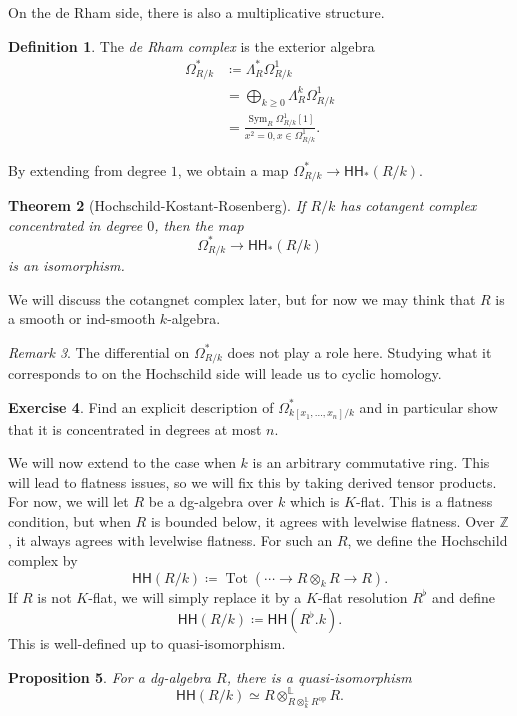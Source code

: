 \documentclass[10pt]{amsart}
\newtheorem{thm}{Theorem}[subsection]
\newtheorem{prop}[thm]{Proposition}
\theoremstyle{definition}
\newtheorem{defn}[thm]{Definition}
\newtheorem{exer}[thm]{Exercise}
\theoremstyle{remark}
\newtheorem{rmk}[thm]{Remark}
\theoremstyle{plain}
\theoremstyle{definition}
\theoremstyle{remark}
\newcommand{\Z}{\mathbb{Z}}
\renewcommand{\L}{\mathbb{L}}
\newcommand{\mr}[1]{\mathrm{#1}}
\newcommand{\ms}[1]{\mathsf{#1}}
\newcommand{\1}{\mathbf{1}}
\newcommand{\2}{\mathbf{2}}
\newcommand{\3}{\mathbf{3}}
\newcommand{\HH}{\ms{HH}}
\DeclareMathOperator{\Sym}{Sym}
\DeclareMathOperator{\Tot}{Tot}
\begin{document}
On the de Rham side, there is also a multiplicative structure.
\begin{defn}
    The \textit{de Rham complex} is the exterior algebra
    \begin{align*}
        \Omega^*_{R/k} &\coloneqq \Lambda_R^* \Omega^1_{R/k} \\
        &= \bigoplus_{k \geq 0} \Lambda_R^k \Omega^1_{R/k} \\
        &= \frac{\Sym_R \Omega^1_{R/k}[1]}{x^2 = 0, x \in \Omega^1_{R/k}}.
    \end{align*}
\end{defn}

By extending from degree $1$, we obtain a map $\Omega^*_{R/k} \to \HH_*(R/k)$.

\begin{thm}[Hochschild-Kostant-Rosenberg]\label{thm:hkr}
    If $R/k$ has cotangent complex concentrated in degree $0$, then the map
    \[ \Omega^*_{R/k} \to \HH_*(R/k) \]
    is an isomorphism.
\end{thm}

We will discuss the cotangnet complex later, but for now we may think that $R$ is a smooth or ind-smooth $k$-algebra.

\begin{rmk}
    The differential on $\Omega^*_{R/k}$ does not play a role here. Studying what it corresponds to on the Hochschild side will leade us to cyclic homology.
\end{rmk}

\begin{exer}
    Find an explicit description of $\Omega^*_{k[x_1, \ldots, x_n]/k}$ and in particular show that it is concentrated in degrees at most $n$.
\end{exer}

We will now extend to the case when $k$ is an arbitrary commutative ring. This will lead to flatness issues, so we will fix this by taking derived tensor products. For now, we will let $R$ be a dg-algebra over $k$ which is $K$-flat. This is a flatness condition, but when $R$ is bounded below, it agrees with levelwise flatness. Over $\Z$, it always agrees with levelwise flatness. For such an $R$, we define the Hochschild complex by
\[ \HH(R/k) \coloneqq \Tot(\cdots \to R \otimes_k R \to R). \]
If $R$ is not $K$-flat, we will simply replace it by a $K$-flat resolution $R^{\flat}$ and define
\[ \HH(R/k) \coloneqq \HH(R^{\flat}.k). \]
This is well-defined up to quasi-isomorphism.

\begin{prop}
    For a dg-algebra $R$, there is a quasi-isomorphism
    \[ \HH(R/k) \simeq R \otimes_{R \otimes_k^{\L} R^{\mr{op}}}^{\L} R. \]
\end{prop}
\end{document}
